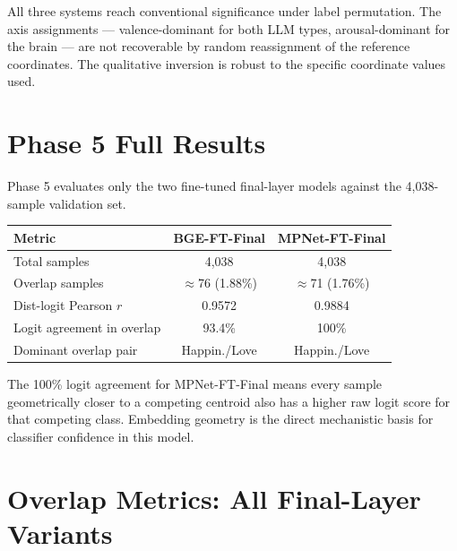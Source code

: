 \documentclass{article}
\begin{document}
All three systems reach conventional significance under label permutation.
The axis assignments --- valence-dominant for both LLM types, arousal-dominant for the
brain --- are not recoverable by random reassignment of the reference coordinates.
The qualitative inversion is robust to the specific coordinate values used.

\section{Phase 5 Full Results}
\label{app:phase5}

Phase 5 evaluates only the two fine-tuned final-layer models against the 4,038-sample
validation set.

\begin{center}
\small
\begin{tabular}{lcc}
\toprule
Metric & BGE-FT-Final & MPNet-FT-Final \\
\midrule
Total samples               & 4,038   & 4,038 \\
Overlap samples             & $\approx$76 (1.88\%) & $\approx$71 (1.76\%) \\
Dist-logit Pearson $r$      & 0.9572  & 0.9884 \\
Logit agreement in overlap  & 93.4\%  & 100\%  \\
Dominant overlap pair       & Happin./Love & Happin./Love \\
\bottomrule
\end{tabular}
\end{center}

The 100\% logit agreement for MPNet-FT-Final means every sample geometrically closer to
a competing centroid also has a higher raw logit score for that competing class.
Embedding geometry is the direct mechanistic basis for classifier confidence in this
model.

\section{Overlap Metrics: All Final-Layer Variants}
\label{app:overlap}
\end{document}
